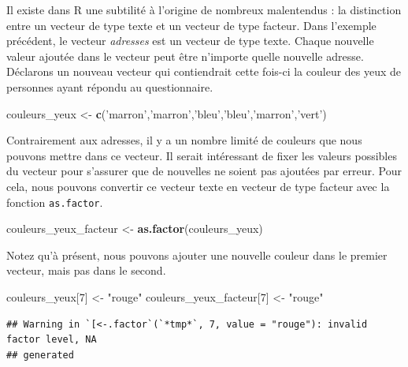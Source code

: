\documentclass[
  11pt,
  french,
]{book}
\makeatletter
\newenvironment{Shaded}{\begin{snugshade}}{\end{snugshade}}
\newcommand{\DecValTok}[1]{\textcolor[rgb]{0.00,0.00,0.81}{#1}}
\newcommand{\KeywordTok}[1]{\textcolor[rgb]{0.13,0.29,0.53}{\textbf{#1}}}
\newcommand{\NormalTok}[1]{#1}
\newcommand{\StringTok}[1]{\textcolor[rgb]{0.31,0.60,0.02}{#1}}
\newenvironment{kframe}{%
\medskip{}
\setlength{\fboxsep}{.8em}
 \def\at@end@of@kframe{}%
 \ifinner\ifhmode%
  \def\at@end@of@kframe{\end{minipage}}%
  \begin{minipage}{\columnwidth}%
 \fi\fi%
 \def\FrameCommand##1{\hskip\@totalleftmargin \hskip-\fboxsep
 \colorbox{shadecolor}{##1}\hskip-\fboxsep
     \hskip-\linewidth \hskip-\@totalleftmargin \hskip\columnwidth}%
 \MakeFramed {\advance\hsize-\width
   \@totalleftmargin\z@ \linewidth\hsize
   \@setminipage}}%
 {\par\unskip\endMakeFramed%
 \at@end@of@kframe}
\newenvironment{kframev}{%
\medskip{}
\setlength{\fboxsep}{.8em}
 \def\at@end@of@kframev{}%
 \ifinner\ifhmode%
  \def\at@end@of@kframev{\end{minipage}}%
  \begin{minipage}{\columnwidth}%
 \fi\fi%
 \def\FrameCommand##1{\hskip\@totalleftmargin \hskip-\fboxsep
 \colorbox{shadebluecolor}{##1}\hskip-\fboxsep
     \hskip-\linewidth \hskip-\@totalleftmargin \hskip\columnwidth}%
 \MakeFramed {\advance\hsize-\width
   \@totalleftmargin\z@ \linewidth\hsize
   \@setminipage}}%
 {\par\unskip\endMakeFramed%
 \at@end@of@kframev}
\renewenvironment{Shaded}{\begin{kframe}}{\end{kframe}}
\newenvironment{rmdblock}[1]
  {
  \begin{itemize}
  \renewcommand{\labelitemi}{
    \raisebox{-.7\height}[0pt][0pt]{
      {\setkeys{Gin}{width=3em,keepaspectratio}\texttt{[image: images/\#1]}}
    }
  }
  \setlength{\fboxsep}{1em}
  \begin{kframev}
  \small
  \item
  }
  {
  \end{kframev}
  \end{itemize}
  }
\newenvironment{bloc_attention}
  {\begin{rmdblock}{attention}}
  {\end{rmdblock}}
\makeatother
\begin{document}
\begin{bloc_attention}

Il existe dans R une subtilité à l'origine de nombreux malentendus : la distinction entre un vecteur de type texte et un vecteur de type facteur. Dans l'exemple précédent, le vecteur \emph{adresses} est un vecteur de type texte. Chaque nouvelle valeur ajoutée dans le vecteur peut être n'importe quelle nouvelle adresse. Déclarons un nouveau vecteur qui contiendrait cette fois-ci la couleur des yeux de personnes ayant répondu au questionnaire.

\begin{Shaded}
\begin{Highlighting}[]
\NormalTok{couleurs_yeux <-}\StringTok{ }\KeywordTok{c}\NormalTok{(}\StringTok{'marron'}\NormalTok{,}\StringTok{'marron'}\NormalTok{,}\StringTok{'bleu'}\NormalTok{,}\StringTok{'bleu'}\NormalTok{,}\StringTok{'marron'}\NormalTok{,}\StringTok{'vert'}\NormalTok{)}
\end{Highlighting}
\end{Shaded}

Contrairement aux adresses, il y a un nombre limité de couleurs que nous pouvons mettre dans ce vecteur. Il serait intéressant de fixer les valeurs possibles du vecteur pour s'assurer que de nouvelles ne soient pas ajoutées par erreur. Pour cela, nous pouvons convertir ce vecteur texte en vecteur de type facteur avec la fonction \texttt{as.factor}.

\begin{Shaded}
\begin{Highlighting}[]
\NormalTok{couleurs_yeux_facteur <-}\StringTok{ }\KeywordTok{as.factor}\NormalTok{(couleurs_yeux)}
\end{Highlighting}
\end{Shaded}

Notez qu'à présent, nous pouvons ajouter une nouvelle couleur dans le premier vecteur, mais pas dans le second.

\begin{Shaded}
\begin{Highlighting}[]
\NormalTok{couleurs_yeux[}\DecValTok{7}\NormalTok{] <-}\StringTok{ "rouge"}
\NormalTok{couleurs_yeux_facteur[}\DecValTok{7}\NormalTok{] <-}\StringTok{ "rouge"}
\end{Highlighting}
\end{Shaded}

\begin{verbatim}
## Warning in `[<-.factor`(`*tmp*`, 7, value = "rouge"): invalid factor level, NA
## generated
\end{verbatim}


\end{bloc_attention}
\end{document}
